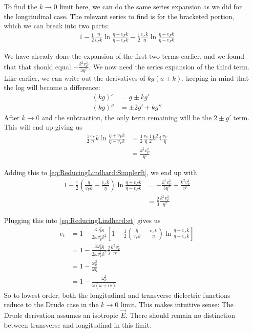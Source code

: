 \documentclass[../../main.tex]{subfiles}
\newcommand{\vf}{v_F}
\begin{document}
To find the $k \rightarrow 0$ limit here, we can do the same series expansion as we did for the longitudinal case. The relevant series to find is for the bracketed portion, which we can break into two parts:
\begin{align} \label{eq:ReducingLindhard:Simplerft}
	 1 - \frac12 \frac{\eta}{\vf k}\ln\frac{\eta + \vf k}{\eta - \vf k} - \frac12 \frac{\vf k}{\eta}\ln\frac{\eta + \vf k}{\eta - \vf k}
\end{align}

We have already done the expansion of the first two terms earlier, and we found that that should equal $- \frac{k^2 \vf^2}{3 \eta^2}$. We now need the series expansion of the third term. Like earlier, we can write out the derivatives of $k g(a \pm k)$, keeping in mind that the log will become a difference:
\begin{align}
	(k g)' &= g \pm k g' \\
	(k g)'' &= \pm 2 g' + k g''
\end{align}
After $k \rightarrow 0$ and the subtraction, the only term remaining will be the $2 \pm g'$ term. This will end up giving us
\begin{align}
	\frac12 \frac{\vf }{\eta} k \ln\frac{\eta + \vf k}{\eta - \vf k} &= \frac12 \frac{\vf}{\eta} \frac12 k^2 4  \frac{\vf}{\eta} \\
	&= \frac{k^2 \vf^2}{\eta^2} 
\end{align}

Adding this to \eqref{eq:ReducingLindhard:Simplerft}, we end up with 
\begin{align}
	1 - \frac12 \left(\frac{\eta}{\vf k} - \frac{\vf k}{\eta} \right)\ln\frac{\eta + \vf k}{\eta - \vf k} &= - \frac{k^2 \vf^2}{3 \eta^2} + \frac{k^2 \vf^2}{\eta^2} \\
	&= \frac23 \frac{k^2 \vf^2}{\eta^2}
\end{align}

Plugging this into \eqref{eq:ReducingLindhard:et} gives us
\begin{align}
	e_t &= 1 - \frac{3 \omega_p^2 \eta}{2\omega \vf^2 k^2} \left[ 1 - \frac12 \left(\frac{\eta}{\vf k} - \frac{\vf k}{\eta} \right)\ln\frac{\eta + \vf k}{\eta - \vf k} \right] \\
	&= 1 - \frac{3 \omega_p^2 \eta}{2\omega \vf^2 k^2} \frac23 \frac{k^2 \vf^2}{\eta^2} \\
	&= 1 - \frac{\omega_p^2}{\omega \eta}\\
	&= 1 - \frac{\omega_p^2}{\omega \left(\omega + i \nu \right) }
\end{align}
So to lowest order, both the longitudinal and transverse dielectric functions reduce to the Drude case in the $k \rightarrow 0$ limit. This makes intuitive sense: The Drude derivation assumes an isotropic $\vec{E}$. There should remain no distinction between transverse and longitudinal in this limit.
\end{document}
